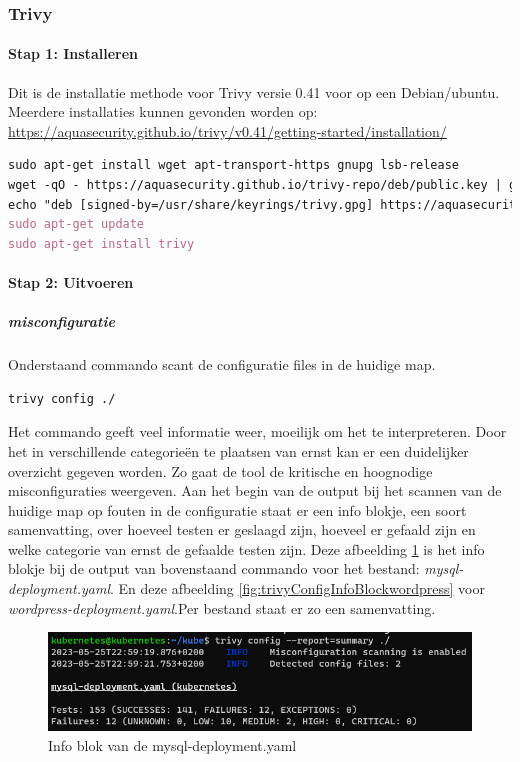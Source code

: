 \subsubsection{Trivy}

\paragraph{Stap 1: Installeren}

Dit is de installatie methode voor Trivy versie 0.41 voor op een Debian/ubuntu. Meerdere installaties kunnen gevonden worden op: \url{https://aquasecurity.github.io/trivy/v0.41/getting-started/installation/}
\begin{lstlisting}[language=tex, caption={Installeren Trivy}]
sudo apt-get install wget apt-transport-https gnupg lsb-release
wget -qO - https://aquasecurity.github.io/trivy-repo/deb/public.key | gpg --dearmor | sudo tee /usr/share/keyrings/trivy.gpg > /dev/null
echo "deb [signed-by=/usr/share/keyrings/trivy.gpg] https://aquasecurity.github.io/trivy-repo/deb $(lsb_release -sc) main" | sudo tee -a /etc/apt/sources.list.d/trivy.list
sudo apt-get update
sudo apt-get install trivy
\end{lstlisting}

\paragraph{Stap 2: Uitvoeren}
\subparagraph{misconfiguratie}
Onderstaand commando scant de configuratie files in de huidige map.
\begin{lstlisting}[language=tex, caption={Scannen configuratie files huidige map}]
trivy config ./
\end{lstlisting}
Het commando geeft veel informatie weer, moeilijk om het te interpreteren. Door het in verschillende categorieën te plaatsen van ernst kan er een duidelijker overzicht gegeven worden. Zo gaat de tool de kritische en hoognodige misconfiguraties weergeven. Aan het begin van de output bij het scannen van de huidige map op fouten in de configuratie staat er een info blokje, een soort samenvatting, over hoeveel testen er geslaagd zijn, hoeveel er gefaald zijn en welke categorie van ernst de gefaalde testen zijn. Deze afbeelding \ref{fig:trivyConfigInfoBlockmysql} is het info blokje bij de output van bovenstaand commando voor het bestand: \textit{mysql-deployment.yaml}. En deze afbeelding \ref{fig:trivyConfigInfoBlockwordpress} voor \textit{wordpress-deployment.yaml}.Per bestand staat er zo een samenvatting.
\begin{flushleft}
    \begin{figure}[h]
        \includegraphics[width=.95\textwidth]{graphics/infoBlockMysqldepl.png}
        \caption{\label{fig:trivyConfigInfoBlockmysql} Info blok van de mysql-deployment.yaml }
    \end{figure} 
\end{flushleft}

